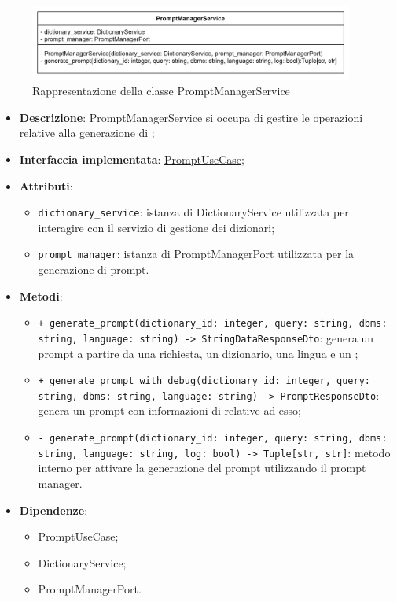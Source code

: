  \label{PromptManagementService}
\begin{figure}[H]
    \centering
    \includegraphics[width=0.95\textwidth]{assets/Backend/prompt_manager_service.png}
    \caption{Rappresentazione della classe PromptManagerService}
  \end{figure}
\begin{itemize}
    \item \textbf{Descrizione}: PromptManagerService si occupa di gestire le operazioni relative alla generazione di ;
    \item \textbf{Interfaccia implementata}: \hyperref[PromptUseCase]{PromptUseCase};
    \item \textbf{Attributi}:
    \begin{itemize}
        \item \texttt{dictionary\_service}: istanza di DictionaryService utilizzata per interagire con il servizio di gestione dei dizionari;
        \item \texttt{prompt\_manager}: istanza di PromptManagerPort utilizzata per la generazione di prompt.
    \end{itemize}
    \item \textbf{Metodi}:
    \begin{itemize}
        \item \texttt{+ generate\_prompt(dictionary\_id: integer, query: string, dbms: string, language: string) -> StringDataResponseDto}: genera un prompt a partire da una richiesta, un dizionario, una lingua e un ;
        \item \texttt{+ generate\_prompt\_with\_debug(dictionary\_id: integer, query: string, dbms: string, language: string) -> PromptResponseDto}: genera un prompt con informazioni di  relative ad esso;
        \item \texttt{- generate\_prompt(dictionary\_id: integer, query: string, dbms: string, language: string, log: bool) -> Tuple[str, str]}: metodo interno per attivare la generazione del prompt utilizzando il prompt manager.
    \end{itemize}
    \item \textbf{Dipendenze}:
    \begin{itemize}
        \item PromptUseCase;
        \item DictionaryService;
        \item PromptManagerPort.
    \end{itemize}
\end{itemize}  